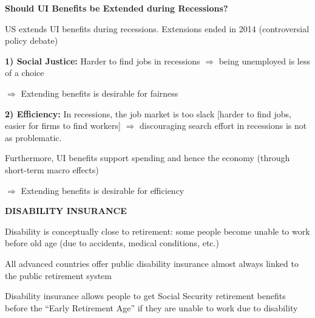 \documentclass[landscape]{slides}
\begin{document}
\begin{slide}
\begin{center}
{\bf Should UI Benefits be Extended during Recessions?}
\end{center}
US extends UI benefits during recessions. Extensions ended in 2014 (controversial policy debate)

\textbf{1) Social Justice:} Harder to find jobs in recessions $\Rightarrow$ being unemployed is less of a choice 

$\Rightarrow$ Extending benefits is desirable for fairness

\textbf{2)  Efficiency:} In recessions, the job market is too slack [harder to find jobs, easier for firms to find workers]
$\Rightarrow$ discouraging search effort in recessions is not as problematic. 

Furthermore, UI benefits support spending and hence the economy (through short-term macro effects) 

$\Rightarrow$ Extending benefits is desirable for efficiency






\end{slide}



\begin{slide}
\begin{center}
{\bf DISABILITY INSURANCE}
\end{center}
Disability is conceptually close to retirement: some people
become unable to work before old age (due to accidents, medical
conditions, etc.)

All advanced countries offer public disability insurance almost
always linked to the public retirement system

Disability insurance allows people to get Social Security retirement benefits before the ``Early
Retirement Age'' if they are unable to work due to disability

\end{slide}
\end{document}
